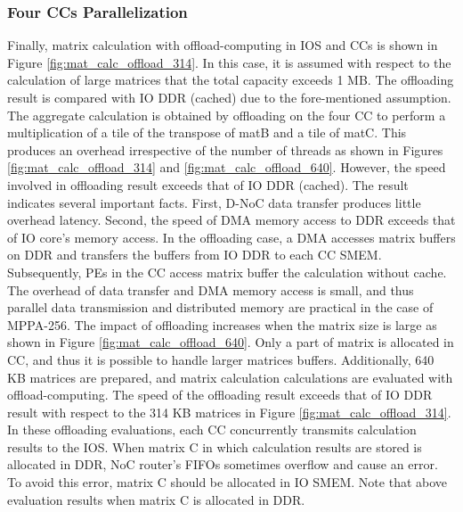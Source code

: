 \documentclass[conference,compsoc]{IEEEtran}
\begin{document}
\subsubsection{Four CCs Parallelization}
\label{sec:four_CCs}
Finally, matrix calculation with offload-computing in IOS and CCs is shown in Figure \ref{fig:mat_calc_offload_314}.
In this case, it is assumed with respect to the calculation of large matrices that the total capacity exceeds 1 MB.
The offloading result is compared with IO DDR (cached) due to the fore-mentioned assumption.
The aggregate calculation is obtained by offloading on the four CC to perform a multiplication of a tile of the transpose of matB and a tile of matC.
This produces an overhead irrespective of the number of threads as shown in Figures \ref{fig:mat_calc_offload_314} and \ref{fig:mat_calc_offload_640}.
However, the speed involved in offloading result exceeds that of IO DDR (cached).
The result indicates several important facts.
First, D-NoC data transfer produces little overhead latency.
Second, the speed of DMA memory access to DDR exceeds that of IO core's memory access.
In the offloading case, a DMA accesses matrix buffers on DDR and transfers the buffers from IO DDR to each CC SMEM.
Subsequently, PEs in the CC access matrix buffer the calculation without cache.
The overhead of data transfer and DMA memory access is small, and thus parallel data transmission and distributed memory are practical in the case of MPPA-256.
The impact of offloading increases when the matrix size is large as shown in Figure \ref{fig:mat_calc_offload_640}.
Only a part of matrix is allocated in CC, and thus it is possible to handle larger matrices buffers.
Additionally, 640 KB matrices are prepared, and matrix calculation calculations are evaluated with offload-computing.
The speed of the offloading result exceeds that of IO DDR result with respect to the 314 KB matrices in Figure \ref{fig:mat_calc_offload_314}.
In these offloading evaluations, each CC concurrently transmits calculation results to the IOS.
When matrix C in which calculation results are stored is allocated in DDR, NoC router's FIFOs sometimes overflow and cause an error.
To avoid this error, matrix C should be allocated in IO SMEM.
Note that above evaluation results when matrix C is allocated in DDR.
\end{document}
